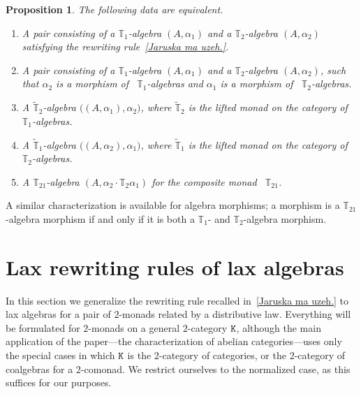 \documentclass[12pt,leqno]{amsart}
\newtheorem{proposition}[theorem]{Proposition}
\theoremstyle{definition}
\def\T{\mathbb{T}}
\newcommand{\K}{{\tt K}}
\newcommand{\4}{\texttt{4}}
\begin{document}
\begin{proposition}
\label{proposition:known_characterization}
The following data are equivalent.
\begin{enumerate}[topsep=0pt, partopsep=0pt, itemsep=0pt, itemindent=-1em]
\item 
A pair consisting of a $\T_1$-algebra $(A,\alpha_1)$ 
and a $\T_2$-algebra $(A,\alpha_2)$ satisfying the rewriting 
rule~\eqref{Jaruska ma uzeh.}.
\item 
A pair consisting of a $\T_1$-algebra $(A,\alpha_1)$ and a $\T_2$-algebra 
$(A,\alpha_2)$, such that $\alpha_2$ is a morphism of \ 
$\T_1$-algebras and $\alpha_1$ is a morphism of \ $\T_2$-algebras.
\item 
A $\widetilde{\T}_2$-algebra $\big((A,\alpha_1),\alpha_2\big)$, 
where $\widetilde{\T}_2$ is the 
lifted monad on the category of \ $\T_1$-algebras.
\item 
A $\widetilde{\T}_1$-algebra $\big((A,\alpha_2),\alpha_1\big)$,
where $\widetilde{\T}_1$ is the lifted monad on the category of \ $\T_2$-algebras.
\item 
A $\T_{21}$-algebra $(A,\alpha_2\cdot \T_2\alpha_1)$ for the composite monad \ $\T_{21}$.
\end{enumerate}
\end{proposition}

A similar characterization is available for algebra morphisms; a
morphism is a $\T_{21}$-algebra morphism if and only if it
is both a $\T_1$- and $\T_2$-algebra morphism.


\section{Lax rewriting rules of lax algebras}
\label{section:lax_lax}


In this section we generalize  the rewriting rule recalled 
in~\eqref{Jaruska ma uzeh.} to lax algebras 
for a pair of $2$-monads related by a
distributive law. Everything will be
formulated for $2$-monads on a general $2$-category $\K$, although the
main application of the paper---the 
characterization of abelian categories---uses only 
the special cases in which $\K$ is the
$2$-category of categories, or the
$2$-category of coalgebras for a 2-comonad. 
We restrict ourselves to the normalized
case, as this suffices for our purposes.
\end{document}
